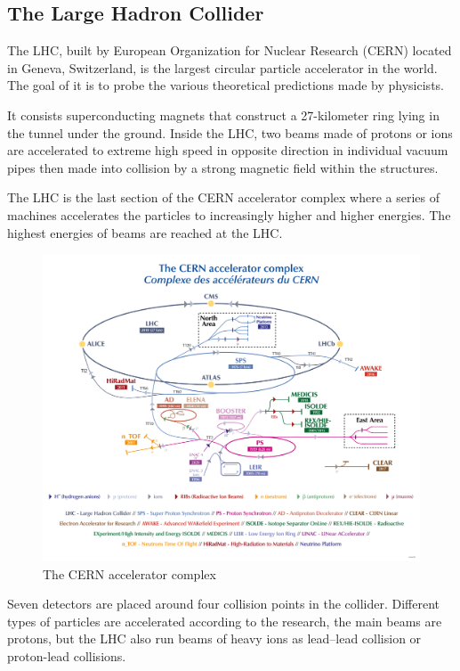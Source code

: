 \documentclass[UTF8,12pt]{ctexart}
\numberwithin{equation}{section}
\begin{document}
\subsection{The Large Hadron Collider}
\label{sec:3.1}

The LHC, built by European Organization for Nuclear Research (CERN) located in Geneva, Switzerland, is the largest circular particle accelerator in the world. The goal of it is to probe the various theoretical predictions made by physicists.
  
It consists superconducting magnets that construct a 27-kilometer ring lying in the tunnel under the ground. Inside the LHC, two beams made of protons or ions are accelerated to extreme high speed in opposite direction in individual vacuum pipes then made into collision by a strong magnetic field within the structures.

The LHC is the last section of the CERN accelerator complex where a series of machines accelerates the particles to increasingly higher and higher energies. The highest energies of beams are reached at the LHC.


 \begin{figure}[htb] 
 	\centering  
 		\includegraphics[width=16cm]{./fig/2022.png}
 		\caption{The CERN accelerator complex}
\end{figure}
 

 Seven detectors are placed around four collision points in the collider. Different types of particles are accelerated according to the research, the main beams are protons, but the LHC also run beams of heavy ions as lead–lead collision or proton-lead collisions.
 
\end{document}
